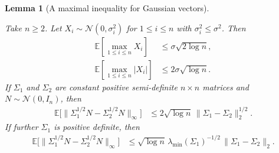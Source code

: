 \documentclass[11pt,lof]{puthesis}
\newcommand{\E}{\ensuremath{\mathbb{E}}}
\newcommand{\cN}{\ensuremath{\mathcal{N}}}
\theoremstyle{break}
\newtheorem{lemma}{Lemma}[section]
\theoremstyle{proof}
\begin{document}
\begin{lemma}[A maximal inequality for Gaussian vectors]
  \label{lem:kernel_app_gaussian_vector_maximal}

  Take $n \geq 2$.
  Let $X_i \sim \cN(0, \sigma_i^2)$
  for $1 \leq i \leq n$
  with $\sigma_i^2 \leq \sigma^2$.
  Then
  \begin{align}
    \label{eq:kernel_app_gaussian_vector_maximal}
    \E\left[
      \max_{1 \leq i \leq n}
      X_i
    \right]
    &\leq
    \sigma \sqrt{2 \log n}, \\
    \label{eq:kernel_app_gaussian_vector_maximal_abs}
    \E\left[
      \max_{1 \leq i \leq n}
      |X_i|
    \right]
    &\leq
    2 \sigma \sqrt{\log n}.
  \end{align}
  If $\Sigma_1$ and $\Sigma_2$ are constant
  positive semi-definite $n \times n$ matrices
  and $N \sim \cN(0,I_n)$,
  then
  \begin{align}
    \label{eq:kernel_app_gaussian_difference_psd}
    \E\Big[
      \big\|
      \Sigma_1^{1/2} N
      - \Sigma_2^{1/2} N
      \big\|_\infty
    \Big]
    &\leq
    2 \sqrt{\log n} \,
    \big\|
    \Sigma_1 - \Sigma_2
    \big\|_2^{1/2}.
  \end{align}
  If further $\Sigma_1$ is
  positive definite,
  then
  \begin{align}
    \label{eq:kernel_app_gaussian_difference_pd}
    \E\Big[
      \big\|
      \Sigma_1^{1/2} N
      - \Sigma_2^{1/2} N
      \big\|_\infty
    \Big]
    &\leq
    \sqrt{\log n} \,
    \lambda_{\min}(\Sigma_1)^{-1/2} \,
    \big\|
    \Sigma_1 - \Sigma_2
    \big\|_2.
  \end{align}

\end{lemma}
\end{document}
